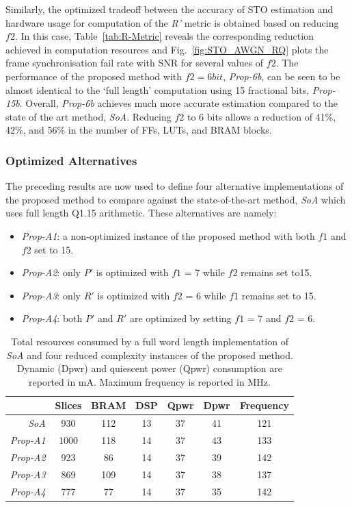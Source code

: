 Similarly, the optimized tradeoff between the accuracy of STO estimation and hardware usage for computation of the \emph{R'} metric is obtained based on reducing $f2$. In this case,
Table~\ref{tab:R-Metric} reveals the corresponding reduction achieved in computation resources and Fig.~\ref{fig:STO_AWGN_RQ} plots the frame synchronisation fail rate with SNR for several values of $f2$.
The performance of the proposed method with $f2=6bit$, \textit{Prop-6b}, can be seen to be almost identical to the `full length' computation using 15 fractional bits, \textit{Prop-15b}. Overall, \textit{Prop-6b} achieves much more accurate estimation compared to the state of the art method, \textit{SoA}. Reducing $f2$ to 6 bits allows a reduction of 41\%, 42\%, and 56\% in the number of FFs, LUTs, and BRAM blocks.

		\subsubsection{Optimized Alternatives}

The preceding results are now used to define four alternative implementations of the proposed method to  compare against the state-of-the-art method, \textit{SoA} which uses full length Q1.15 arithmetic. These alternatives are namely:
\begin{itemize}
\item \textit{Prop-A1}: a non-optimized instance of the proposed method with both $f1$ and $f2$ set to 15.
\item \textit{Prop-A2}: only $P'$ is optimized with $f1$ = 7 while $f2$ remains set to15.
\item \textit{Prop-A3}: only $R'$ is optimized with  $f2$ = 6 while $f1$ remains set to 15.
\item \textit{Prop-A4}: both $P'$ and $R'$ are optimized by setting $f1$ = 7 and $f2$ = 6.
\end{itemize}


\begin{table}[h]
	\centering
	\caption{ Total resources consumed by a full word length implementation of \textit{SoA} and four reduced complexity instances of the proposed method. Dynamic (Dpwr) and quiescent power (Qpwr) consumption are reported in mA. Maximum frequency is reported in MHz.}
	\label{tab:Int_Imp_Rpt}
	\begin{tabular}{r|c|c|c|c|c|c}
        \hline \hline
    			 {}	&  {Slices} &  {BRAM} &  {DSP}&  {Qpwr}& {Dpwr}& {Frequency}\\
	\hline
		\textit{SoA} 	& 930 	& 112 	& 13	& 37	& 41 & 121 \\
		\textit{Prop-A1}	& 1000 	& 118	& 14 	& 37 	& 43 & 133 \\
		\textit{Prop-A2}	& 923 	& 86	& 14 	& 37	& 39 & 142 \\
		\textit{Prop-A3}	& 869  	& 109  	& 14	& 37 	& 38 & 137 \\
		\textit{Prop-A4}	& 777  	& 77  	& 14	& 37 	& 35 & 142 \\
	\hline \hline
    \end{tabular}
\end{table}


